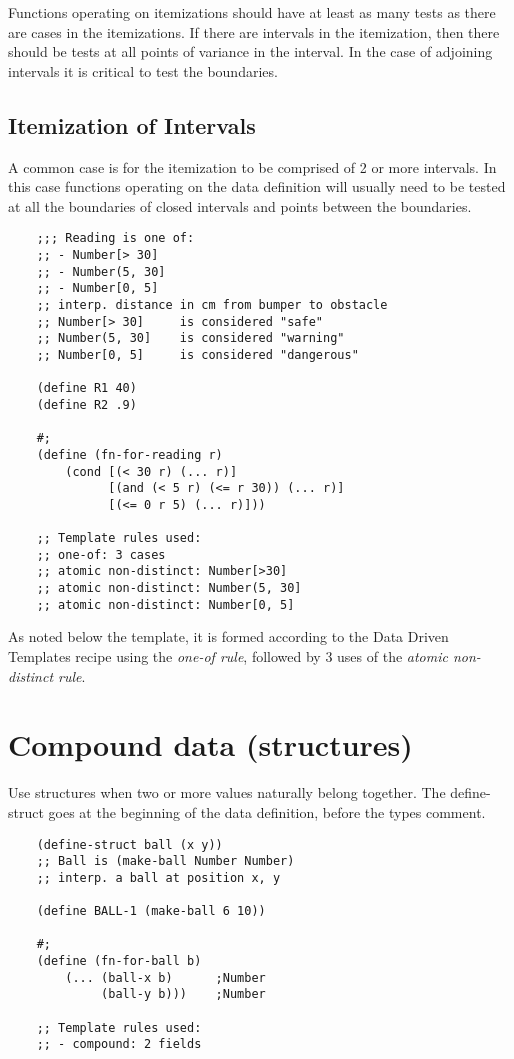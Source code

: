 \documentclass[11pt,a4paper]{report}
\begin{document}
	Functions operating on itemizations should have at least as many tests as there are cases in the
	itemizations. If there are intervals in the itemization, then there should be tests at all points of
	variance in the interval. In the case of adjoining intervals it is critical to test the boundaries.
	
	\subsection*{Itemization of Intervals}
	A common case is for the itemization to be comprised of 2 or more intervals. In this case functions
	operating on the data definition will usually need to be tested at all the boundaries of closed
	intervals and points between the boundaries.
	
	\begin{verbatim}
	;;; Reading is one of:
	;; - Number[> 30]
	;; - Number(5, 30]
	;; - Number[0, 5]
	;; interp. distance in cm from bumper to obstacle
	;; Number[> 30] 	is considered "safe"
	;; Number(5, 30]	is considered "warning"
	;; Number[0, 5] 	is considered "dangerous"
	
	(define R1 40)
	(define R2 .9)
	
	#;
	(define (fn-for-reading r)
		(cond [(< 30 r) (... r)]
		      [(and (< 5 r) (<= r 30)) (... r)]
		      [(<= 0 r 5) (... r)]))
		      
	;; Template rules used:
	;; one-of: 3 cases
	;; atomic non-distinct: Number[>30]
	;; atomic non-distinct: Number(5, 30]
	;; atomic non-distinct: Number[0, 5]
	\end{verbatim}
	
	As noted below the template, it is formed according to the Data Driven Templates recipe using the
	\emph{one-of rule}, followed by 3 uses of the \emph{atomic non-distinct rule}.
	\pagebreak
	\section{Compound data (structures)} \label{sec:compound_data}
	Use structures when two or more values naturally belong together. The define-struct goes at the
	beginning of the data definition, before the types comment.
	
	\begin{verbatim}
	(define-struct ball (x y))
	;; Ball is (make-ball Number Number)
	;; interp. a ball at position x, y
	
	(define BALL-1 (make-ball 6 10))
	
	#;
	(define (fn-for-ball b)
		(... (ball-x b)      ;Number
		     (ball-y b)))    ;Number
		
	;; Template rules used:
	;; - compound: 2 fields
	\end{verbatim}
	
\end{document}
